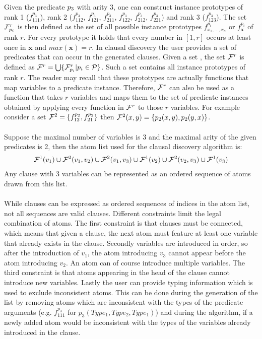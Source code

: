 Given the predicate $p_3$ with arity 3, one can construct instance prototypes of rank 1 ($f^{p_3}_{111}$), rank 2 ($f^{p_3}_{112}$, $f^{p_3}_{121}$, $f^{p_3}_{211}$, $f^{p_3}_{122}$, $f^{p_3}_{212}$, $f^{p_3}_{221}$) and rank 3 ($f^{p_3}_{123}$). The set $\mathcal{F}^r_{p_i}$ is then defined as the set of all possible instance prototypes $f^{p_i}_{x_1, ..., x_n}$ or $f^{p_i}_\mathbf{x}$ of rank $r$. For every prototype it holds that every number in $[1, r]$ occurs at least once in $\mathbf{x}$ and $max(\mathbf{x}) = r$. In clausal discovery the user provides a set  of predicates that can occur in the generated clauses. Given a set , the set $\mathcal{F}^r$ is defined as $\mathcal{F}^r = \bigcup \{\mathcal{F}^r_{p_i} | p_i \in \mathcal{P}\}$. Such a set contains all instance prototypes of rank $r$. The reader may recall that these prototypes are actually functions that map variables to a predicate instance. Therefore, $\mathcal{F}^r$ can also be used as a function that takes $r$ variables and maps them to the set of predicate instances obtained by applying every function in $\mathcal{F}^r$ to those $r$ variables. For example consider a set $\mathcal{F}^2 = \{f^{p_2}_{12}, f^{p_2}_{21}\}$ then $\mathcal{F}^2(x, y) = \{p_2(x, y), p_2(y, x)\}$.
\\\\
Suppose the maximal number of variables is 3 and the maximal arity of the given predicates is 2, then the atom list used for the clausal discovery algorithm is:
\begin{align*}
\mathcal{F}^1(v_1) \cup \mathcal{F}^2(v_1, v_2) \cup \mathcal{F}^2(v_1, v_3) \cup \mathcal{F}^1(v_2) \cup \mathcal{F}^2(v_2, v_3) \cup \mathcal{F}^1(v_3)
\end{align*}
Any clause with 3 variables can be represented as an ordered sequence of atoms drawn from this list.
\\\\
While clauses can be expressed as ordered sequences of indices in the atom list, not all sequences are valid clauses. Different constraints limit the legal combination of atoms. The first constraint is that clauses must be connected, which means that given a clause, the next atom must feature at least one variable that already exists in the clause. Secondly variables are introduced in order, so after the introduction of $v_1$, the atom introducing $v_3$ cannot appear before the atom introducing $v_2$. An atom can of course introduce multiple variables. The third constraint is that atoms appearing in the head of the clause cannot introduce new variables. Lastly the user can provide typing information which is used to exclude inconsistent atoms. This can be done during the generation of the list by removing atoms which are inconsistent with the types of the predicate arguments (e.g. $f^{p_3}_{111}$ for $p_3(Type_1, Type_2, Type_1)$) and during the algorithm, if a newly added atom would be inconsistent with the types of the variables already introduced in the clause.

